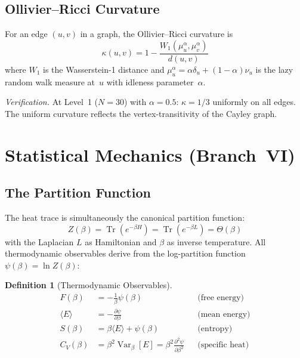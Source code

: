 \documentclass[12pt,reqno]{amsart}
\theoremstyle{plain}
\theoremstyle{definition}
\newtheorem{definition}[theorem]{Definition}
\theoremstyle{remark}
\DeclareMathOperator{\Tr}{Tr}
\DeclareMathOperator{\Var}{Var}
\begin{document}
\subsection{Ollivier--Ricci Curvature}

For an edge $(u,v)$ in a graph, the Ollivier--Ricci curvature is
\begin{equation}\label{eq:ollivier}
  \kappa(u,v) = 1 - \frac{W_1(\mu_u^\alpha, \mu_v^\alpha)}{d(u,v)}
\end{equation}
where $W_1$ is the Wasserstein-1 distance and $\mu_u^\alpha = \alpha
\delta_u + (1-\alpha) \nu_u$ is the lazy random walk measure at~$u$
with idleness parameter~$\alpha$.

\emph{Verification.}  At Level~1 ($N=30$) with $\alpha = 0.5$:
$\kappa = 1/3$ uniformly on all edges.  The uniform curvature
reflects the vertex-transitivity of the Cayley graph.


\section{Statistical Mechanics (Branch~VI)}\label{sec:thermo}

\subsection{The Partition Function}

The heat trace is simultaneously the canonical partition function:
\begin{equation}\label{eq:partition}
  Z(\beta) = \Tr(e^{-\beta H}) = \Tr(e^{-\beta L}) = \Theta(\beta)
\end{equation}
with the Laplacian $L$ as Hamiltonian and $\beta$ as inverse
temperature.  All thermodynamic observables derive from the
log-partition function $\psi(\beta) = \ln Z(\beta)$:

\begin{definition}[Thermodynamic Observables]
  \begin{align}
    F(\beta) &= -\frac{1}{\beta} \psi(\beta)
    &&\text{(free energy)} \label{eq:free_energy} \\
    \langle E \rangle &= -\frac{\partial \psi}{\partial \beta}
    &&\text{(mean energy)} \label{eq:mean_energy} \\
    S(\beta) &= \beta \langle E \rangle + \psi(\beta)
    &&\text{(entropy)} \label{eq:entropy} \\
    C_V(\beta) &= \beta^2 \Var_\beta[E]
    = \beta^2 \frac{\partial^2 \psi}{\partial \beta^2}
    &&\text{(specific heat)} \label{eq:specific_heat}
  \end{align}
\end{definition}
\end{document}
